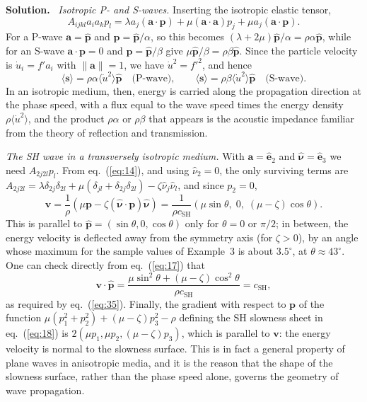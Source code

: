 \documentclass[a4paper,12pt]{paper}
\newenvironment{solution}{\par\noindent\textbf{Solution.}\ }{\par\medskip}
\begin{document}
\begin{solution}
\emph{Isotropic P- and S-waves.} Inserting the isotropic elastic tensor,
\begin{equation}
A_{ijkl}a_{i}a_{k}p_{l}=\lambda a_{j}(\mathbf{a}\cdot\mathbf{p})+\mu(\mathbf{a}\cdot\mathbf{a})p_{j}+\mu a_{j}(\mathbf{a}\cdot\mathbf{p}).
\label{eq:36}
\end{equation}
For a P-wave $\mathbf{a}=\hat{\mathbf{p}}$ and $\mathbf{p}=\hat{\mathbf{p}}/\alpha$, so this
becomes $(\lambda+2\mu)\hat{\mathbf{p}}/\alpha=\rho\alpha\hat{\mathbf{p}}$, while for an S-wave
$\mathbf{a}\cdot\mathbf{p}=0$ and $\mathbf{p}=\hat{\mathbf{p}}/\beta$ give $\mu\hat{\mathbf{p}}/\beta=\rho\beta\hat{\mathbf{p}}$.
Since the particle velocity is $\dot{u}_{i}=f'a_{i}$ with $\|\mathbf{a}\|=1$, we have
$\dot{u}^{2}=f'^{2}$, and hence
\begin{equation}
\langle\mathbf{s}\rangle=\rho\alpha\langle\dot{u}^{2}\rangle\hat{\mathbf{p}}\quad\text{(P-wave)},\qquad
\langle\mathbf{s}\rangle=\rho\beta\langle\dot{u}^{2}\rangle\hat{\mathbf{p}}\quad\text{(S-wave)}.
\label{eq:37}
\end{equation}
In an isotropic medium, then, energy is carried along the propagation direction at the phase
speed, with a flux equal to the wave speed times the energy density
$\rho\langle\dot{u}^{2}\rangle$, and the product $\rho\alpha$ or $\rho\beta$ that appears is the
acoustic impedance familiar from the theory of reflection and transmission.

\emph{The SH wave in a transversely isotropic medium.} With $\mathbf{a}=\hat{\mathbf{e}}_{2}$
and $\hat{\bm{\nu}}=\hat{\mathbf{e}}_{3}$ we need $A_{2j2l}p_{l}$. From eq.~(\ref{eq:14}), and
using $\hat{\nu}_{2}=0$, the only surviving terms are
$A_{2j2l}=\lambda\delta_{2j}\delta_{2l}+\mu(\delta_{jl}+\delta_{2j}\delta_{2l})-\zeta\hat{\nu}_{j}\hat{\nu}_{l}$, and since $p_{2}=0$,
\begin{equation}
\mathbf{v}=\frac{1}{\rho}\left(\mu\mathbf{p}-\zeta(\hat{\bm{\nu}}\cdot\mathbf{p})\hat{\bm{\nu}}\right)
=\frac{1}{\rho c_{\mathrm{SH}}}\left(\mu\sin\theta,\;0,\;(\mu-\zeta)\cos\theta\right).
\label{eq:38}
\end{equation}
This is parallel to $\hat{\mathbf{p}}=(\sin\theta,0,\cos\theta)$ only for $\theta=0$ or
$\pi/2$; in between, the energy velocity is deflected away from the symmetry axis (for $\zeta>0$), by an angle
whose maximum for the sample values of Example~3 is about $3.5^{\circ}$, at $\theta\approx43^{\circ}$. One can check directly
from eq.~(\ref{eq:17}) that
\begin{equation}
\mathbf{v}\cdot\hat{\mathbf{p}}=\frac{\mu\sin^{2}\theta+(\mu-\zeta)\cos^{2}\theta}{\rho c_{\mathrm{SH}}}=c_{\mathrm{SH}},
\label{eq:39}
\end{equation}
as required by eq.~(\ref{eq:35}). Finally, the gradient with respect to $\mathbf{p}$ of the function
$\mu(p_{1}^{2}+p_{2}^{2})+(\mu-\zeta)p_{3}^{2}-\rho$ defining the SH slowness sheet in
eq.~(\ref{eq:18}) is $2(\mu p_{1},\mu p_{2},(\mu-\zeta)p_{3})$, which is parallel to
$\mathbf{v}$: the energy velocity is normal to the slowness surface. This is in fact a general
property of plane waves in anisotropic media, and it is the reason that the shape of the
slowness surface, rather than the phase speed alone, governs the geometry of wave propagation.
\end{solution}
\end{document}
